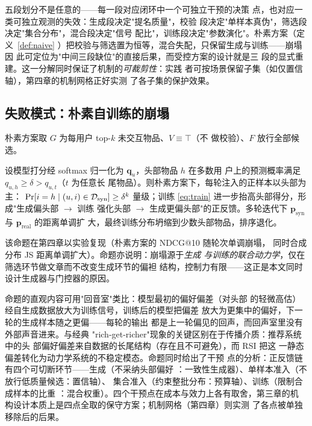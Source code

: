五段划分不是任意的——每一段对应闭环中一个可独立干预的决策
点，也对应一类可独立观测的失效：生成段决定"提名质量"，校验
段决定"单样本真伪"，筛选段决定"集合分布"，混合段决定"信号
配比"，训练段决定"参数演化"。朴素方案（定义~\ref{def:naive}
）把校验与筛选置为恒等，混合失配，只保留生成与训练——崩塌因
此可定位为"中间三段缺位"的直接后果，而受控方案的设计就是三
段的显式重建。这一分解同时保证了机制的\emph{可裁剪性}：实践
者可按场景保留子集（如仅置信轴），第四章的机制网格正好实测
了各子集的保护效果。

\subsection{失败模式：朴素自训练的崩塌}
\begin{definition}\label{def:naive}
朴素方案取 $G$ 为每用户 top-$k$ 未交互物品、$V \equiv \top$（不
做校验）、$F$ 放行全部候选。
\end{definition}

\begin{proposition}[头部自强化]\label{prop:collapse}
设模型打分经 softmax 归一化为 $\bm{q}_u$，头部物品 $h$ 在多数用
户上的预测概率满足 $q_{u,h} \geq \delta > q_{u,t}$（$t$ 为任意长
尾物品）。则朴素方案下，每轮注入的正样本以头部为主：
$\Pr[i = h \mid (u,i) \in \mathcal{D}_{\mathrm{syn}}] \geq \delta^k$ 量级；训练
\eqref{eq:train} 进一步抬高头部得分，形成"生成偏头部 $\to$ 训练
强化头部 $\to$ 生成更偏头部"的正反馈。多轮迭代下
$\bm{p}_{\mathrm{syn}}$ 与 $\bm{p}_{\mathrm{real}}$ 的距离单调扩
大，最终训练分布坍缩到少数头部物品，排序退化。
\end{proposition}

该命题在第四章以实验复现（朴素方案的 NDCG@10 随轮次单调崩塌，
同时合成分布 JS 距离单调扩大）。命题亦说明：崩塌源于\emph{生成
与训练的联合动力学}，仅在筛选环节做文章而不改变生成环节的偏袒
结构，控制力有限——这正是本文同时设计生成器与门控器的原因。

命题的直观内容可用"回音室"类比：模型最初的偏好偏差（对头部
的轻微高估）经自生成数据放大为训练信号，训练后的模型把偏差
放大为更集中的偏好，下一轮的生成样本随之更偏——每轮的输出
都是上一轮偏见的回声，而回声室里没有外部声音进来。与经典
"rich-get-richer"现象的关键区别在于传播介质：推荐系统中的头
部偏好偏差来自数据的长尾结构（存在且不可避免），而 RSI 把这
一静态偏差转化为动力学系统的不稳定模态。命题同时给出了干预
点的分析：正反馈链有四个可切断环节——生成（不采纳头部偏好
：一致性生成器）、单样本准入（不放行低质量候选：置信轴）、
集合准入（约束整批分布：预算轴）、训练（限制合成样本的比重
：混合权重）。四个干预点在成本与效力上各有取舍，第三章的机
构设计本质上是四点全取的保守方案；机制网格（第四章）则实测
了各点被单独移除后的后果。

